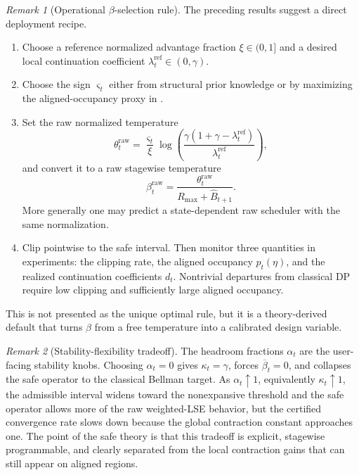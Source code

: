 \documentclass{article}
\theoremstyle{remark}
\newtheorem{remark}[remark]{Remark}
\newcommand{\betacap}{\overline\beta}
\newcommand{\Bhat}{\widehat B}
\begin{document}
\begin{remark}[Operational $\beta$-selection rule]
\label{rem:beta-selection-rule}
The preceding results suggest a direct deployment recipe.
\begin{enumerate}[leftmargin=1.5em,itemsep=1pt]
\item Choose a reference normalized advantage fraction $\xi\in(0,1]$ and a desired local continuation coefficient $\lambda_t^{\mathrm{ref}}\in(0,\gamma)$.
\item Choose the sign $\varsigma_t$ either from structural prior knowledge or by maximizing the aligned-occupancy proxy in .
\item Set the raw normalized temperature
\[
\theta_t^{\mathrm{raw}}
=
\frac{\varsigma_t}{\xi}
\log\!\left(\frac{\gamma(1+\gamma-\lambda_t^{\mathrm{ref}})}{\lambda_t^{\mathrm{ref}}}\right),
\]
and convert it to a raw stagewise temperature
\[
\beta_t^{\mathrm{raw}}=\frac{\theta_t^{\mathrm{raw}}}{R_{\max}+\Bhat_{t+1}}.
\]
More generally one may predict a state-dependent raw scheduler with the same normalization.
\item Clip pointwise to the safe interval. Then monitor three quantities in experiments: the clipping rate, the aligned occupancy $p_t(\eta)$, and the realized continuation coefficients $d_t$. Nontrivial departures from classical DP require low clipping and sufficiently large aligned occupancy.
\end{enumerate}
This is not presented as the unique optimal rule, but it is a theory-derived default that turns $\beta$ from a free temperature into a calibrated design variable.
\end{remark}

\begin{remark}[Stability-flexibility tradeoff]
\label{rem:safety-tradeoff}
The headroom fractions $\alpha_t$ are the user-facing stability knobs.
Choosing $\alpha_t=0$ gives $\kappa_t=\gamma$, forces $\betacap_t=0$, and collapses the safe operator to the classical Bellman target.
As $\alpha_t\uparrow 1$, equivalently $\kappa_t\uparrow 1$, the admissible interval widens toward the nonexpansive threshold and the safe operator allows more of the raw weighted-LSE behavior, but the certified convergence rate slows down because the global contraction constant approaches one.
The point of the safe theory is that this tradeoff is explicit, stagewise programmable, and clearly separated from the local contraction gains that can still appear on aligned regions.
\end{remark}
\end{document}
